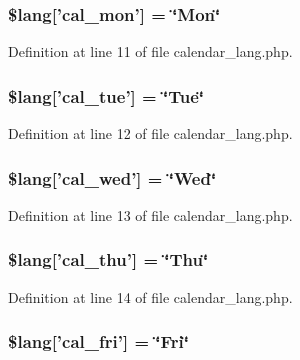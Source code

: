 \subsubsection[{\$lang}]{\setlength{\rightskip}{0pt plus 5cm}\$lang['cal\-\_\-mon'] = \char`\"{}Mon\char`\"{}}\label{calendar__lang_8php_a3e1c2966ff8ebb4b528d9a6e60a7a11c}


Definition at line 11 of file calendar\-\_\-lang.\-php.

\subsubsection[{\$lang}]{\setlength{\rightskip}{0pt plus 5cm}\$lang['cal\-\_\-tue'] = \char`\"{}Tue\char`\"{}}\label{calendar__lang_8php_ad6b1b4ce855d9ed3f88dc4e7e71f5248}


Definition at line 12 of file calendar\-\_\-lang.\-php.

\subsubsection[{\$lang}]{\setlength{\rightskip}{0pt plus 5cm}\$lang['cal\-\_\-wed'] = \char`\"{}Wed\char`\"{}}\label{calendar__lang_8php_a94d7b85acb850c5930399c9099b22412}


Definition at line 13 of file calendar\-\_\-lang.\-php.

\subsubsection[{\$lang}]{\setlength{\rightskip}{0pt plus 5cm}\$lang['cal\-\_\-thu'] = \char`\"{}Thu\char`\"{}}\label{calendar__lang_8php_af49921f5f0bcc54c07efed2cf4b71e01}


Definition at line 14 of file calendar\-\_\-lang.\-php.

\subsubsection[{\$lang}]{\setlength{\rightskip}{0pt plus 5cm}\$lang['cal\-\_\-fri'] = \char`\"{}Fri\char`\"{}}\label{calendar__lang_8php_abfe2cd9d203b296392f657caf8488b53}


